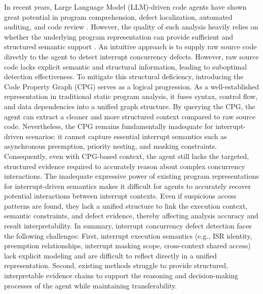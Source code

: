 \documentclass[conference]{IEEEtran}
\begin{document}
In recent years, Large Language Model (LLM)-driven code agents have shown great potential in program comprehension, defect localization, automated auditing, and code review \cite{li2024enhancing, liu2025llm, wang2024llmdfa, nguyen2025empirical, li2025codedoctor, yu2024fine, nashaat2024towards}. However, the quality of such analysis heavily relies on whether the underlying program representation can provide sufficient and structured semantic support \cite{lekssays2025llmxcpg, shao2025graphfvd, peng2025keep}. An intuitive approach is to supply raw source code directly to the agent to detect interrupt concurrency defects. However, raw source code lacks explicit semantic and structural information, leading to suboptimal detection effectiveness. To mitigate this structural deficiency, introducing the Code Property Graph (CPG) serves as a logical progression. As a well-established representation in traditional static program analysis, it fuses syntax, control flow, and data dependencies into a unified graph structure. By querying the CPG, the agent can extract a cleaner and more structured context compared to raw source code. Nevertheless, the CPG remains fundamentally inadequate for interrupt-driven scenarios: it cannot capture essential interrupt semantics such as asynchronous preemption, priority nesting, and masking constraints. Consequently, even with CPG-based context, the agent still lacks the targeted, structured evidence required to accurately reason about complex concurrency interactions. The inadequate expressive power of existing program representations for interrupt-driven semantics makes it difficult for agents to accurately recover potential interactions between interrupt contexts. Even if suspicious access patterns are found, they lack a unified structure to link the execution context, semantic constraints, and defect evidence, thereby affecting analysis accuracy and result interpretability. In summary, interrupt concurrency defect detection faces the following challenges: First, interrupt execution semantics (e.g., ISR identity, preemption relationships, interrupt masking scope, cross-context shared access) lack explicit modeling and are difficult to reflect directly in a unified representation. Second, existing methods struggle to provide structured, interpretable evidence chains to support the reasoning and decision-making processes of the agent while maintaining transferability.
\end{document}
